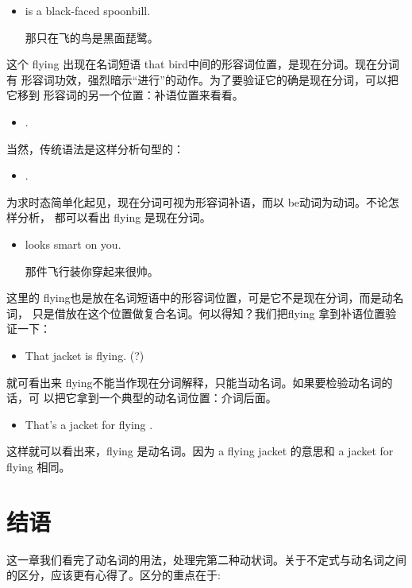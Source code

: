 \begin{itemize}
\item {} is a black-faced spoonbill.

  那只在飞的鸟是黑面琵鹭。
\end{itemize}

这个 flying 出现在名词短语 that bird中间的形容词位置，是现在分词。现在分词有
形容词功效，强烈暗示“进行”的动作。为了要验证它的确是现在分词，可以把它移到
形容词的另一个位置：补语位置来看看。

\begin{itemize}
\item  {}  .
\end{itemize}

当然，传统语法是这样分析句型的：

\begin{itemize}
\item  {} .
\end{itemize}

为求时态简单化起见，现在分词可视为形容词补语，而以 be动词为动词。不论怎样分析，
都可以看出 flying 是现在分词。

\begin{itemize}
\item  {} looks smart on you.

  那件飞行装你穿起来很帅。
\end{itemize}
这里的 flying也是放在名词短语中的形容词位置，可是它不是现在分词，而是动名词，
只是借放在这个位置做复合名词。何以得知？我们把flying 拿到补语位置验证一下：

\begin{itemize}
\item  That jacket is flying. (?)
\end{itemize}
就可看出来 flying不能当作现在分词解释，只能当动名词。如果要检验动名词的话，可
以把它拿到一个典型的动名词位置：介词后面。
\begin{itemize}
\item  That's a jacket for flying .
\end{itemize}
这样就可以看出来，flying 是动名词。因为 a flying jacket 的意思和 a
jacket for flying 相同。

\section{结语}

这一章我们看完了动名词的用法，处理完第二种动状词。关于不定式与动名词之间的区分，应该更有心得了。区分的重点在于:

